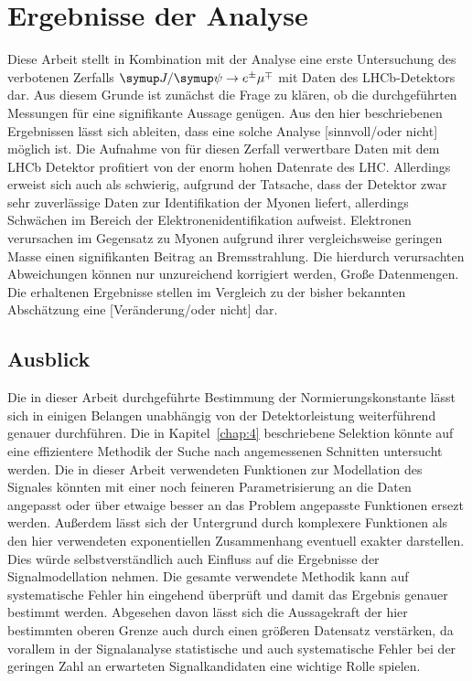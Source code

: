 \chapter{Ergebnisse der Analyse}
\label{chap:5}
%
Diese Arbeit stellt in Kombination mit der Analyse \cite{ba-maik} eine erste Untersuchung des verbotenen Zerfalls $\signal$ mit
Daten des LHCb-Detektors dar. Aus diesem Grunde ist zunächst die Frage zu klären, ob die durchgeführten Messungen für eine signifikante
Aussage genügen. Aus den hier beschriebenen Ergebnissen lässt sich ableiten, dass eine solche Analyse [sinnvoll/oder nicht] möglich ist.
Die Aufnahme von für diesen Zerfall verwertbare Daten mit dem LHCb Detektor profitiert von der enorm hohen Datenrate des LHC. Allerdings
erweist sich auch als schwierig, aufgrund der Tatsache, dass der Detektor zwar sehr zuverlässige Daten zur Identifikation der Myonen liefert,
allerdings Schwächen im Bereich der Elektronenidentifikation aufweist. Elektronen verursachen im Gegensatz zu Myonen aufgrund ihrer vergleichsweise
geringen Masse einen signifikanten Beitrag an Bremsstrahlung. Die hierdurch verursachten Abweichungen können nur unzureichend korrigiert werden,
Große Datenmengen.
Die erhaltenen Ergebnisse stellen im Vergleich zu der bisher bekannten Abschätzung eine [Veränderung/oder nicht] dar.

\section{Ausblick}
%
Die in dieser Arbeit durchgeführte Bestimmung der Normierungskonstante lässt sich in einigen Belangen unabhängig von der Detektorleistung
weiterführend genauer durchführen. Die in Kapitel~\ref{chap:4} beschriebene Selektion könnte auf eine effizientere Methodik der Suche nach angemessenen
Schnitten untersucht werden. Die in dieser Arbeit verwendeten Funktionen zur Modellation des Signales könnten mit einer noch feineren Parametrisierung
an die Daten angepasst oder über etwaige besser an das Problem angepasste Funktionen ersezt werden. Außerdem lässt sich der Untergrund durch komplexere
Funktionen als den hier verwendeten exponentiellen Zusammenhang eventuell exakter darstellen. Dies würde selbstverständlich auch Einfluss auf die
Ergebnisse der Signalmodellation nehmen. Die gesamte verwendete Methodik kann auf systematische Fehler hin eingehend überprüft und damit das Ergebnis
genauer bestimmt werden. Abgesehen davon lässt sich die Aussagekraft der hier bestimmten oberen Grenze auch durch einen größeren Datensatz verstärken,
da vorallem in der Signalanalyse statistische und auch systematische Fehler bei der geringen Zahl an erwarteten Signalkandidaten eine wichtige Rolle
spielen.
